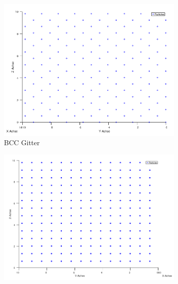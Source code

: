 \documentclass[12pt,a4paper,ngerman]{article}
\begin{document}
	\begin{figure}
	\centering
	\begin{subfigure}[b]{0.3\textwidth}
		\includegraphics[width=\textwidth]{data/BCC_perfect.png}
		\caption{BCC Gitter}
	\end{subfigure}
	\hfill %
	\begin{subfigure}[b]{0.3\textwidth}
		\includegraphics[width=\textwidth]{data/FCC_perfect.png}

\end{subfigure}
\end{figure}
\end{document}

